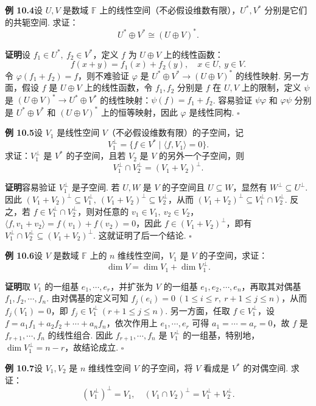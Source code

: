 \documentclass[UTF8, 12pt, fontset=fandol, oneside]{ctexart}
\begin{document}
\noindent\textbf{例 10.4}\quad 设 $U,V$ 是数域 $\mathbb{F}$ 上的线性空间（不必假设维数有限），$U^*,V^*$ 分别是它们的共轭空间. 求证：
\[
U^*\oplus V^*\cong (U\oplus V)^*.
\]

\noindent\textbf{证明}\quad 设 $f_1\in U^*,\ f_2\in V^*$，定义 $f$ 为 $U\oplus V$ 上的线性函数：
\[
f(x+y)=f_1(x)+f_2(y),\quad x\in U,\ y\in V.
\]
令 $\varphi(f_1+f_2)=f$，则不难验证 $\varphi$ 是 $U^*\oplus V^*\to (U\oplus V)^*$ 的线性映射. 另一方面，假设 $f$ 是 $U\oplus V$ 上的线性函数，令 $f_1,f_2$ 分别是 $f$ 在 $U,V$ 上的限制，定义 $\psi$ 是 $(U\oplus V)^*\to U^*\oplus V^*$ 的线性映射：$\psi(f)=f_1+f_2$. 容易验证 $\psi\varphi$ 和 $\varphi\psi$ 分别是 $U^*\oplus V^*$ 和 $(U\oplus V)^*$ 上的恒等映射，因此 $\varphi$ 是线性同构. $\square$

\noindent\textbf{例 10.5}\quad 设 $V_1$ 是线性空间 $V$（不必假设维数有限）的子空间，记
\[
V_1^\perp=\{f\in V^*\mid \langle f,V_1\rangle=0\}.
\]
求证：$V_1^\perp$ 是 $V^*$ 的子空间，且若 $V_2$ 是 $V$ 的另外一个子空间，则
\[
V_1^\perp\cap V_2^\perp=(V_1+V_2)^\perp.
\]

\noindent\textbf{证明}\quad 容易验证 $V_1^\perp$ 是子空间. 若 $U,W$ 是 $V$ 的子空间且 $U\subseteq W$，显然有 $W^\perp\subseteq U^\perp$. 因此 $(V_1+V_2)^\perp\subseteq V_1^\perp,\ (V_1+V_2)^\perp\subseteq V_2^\perp$，从而 $(V_1+V_2)^\perp\subseteq V_1^\perp\cap V_2^\perp$. 反之，若 $f\in V_1^\perp\cap V_2^\perp$，则对任意的 $v_1\in V_1,\ v_2\in V_2$，$\langle f,v_1+v_2\rangle=f(v_1)+f(v_2)=0$，因此 $f\in(V_1+V_2)^\perp$，即有 $V_1^\perp\cap V_2^\perp\subseteq (V_1+V_2)^\perp$. 这就证明了后一个结论. $\square$

\noindent\textbf{例 10.6}\quad 设 $V$ 是数域 $\mathbb{F}$ 上的 $n$ 维线性空间，$V_1$ 是 $V$ 的子空间，求证：
\[
\dim V=\dim V_1+\dim V_1^\perp.
\]

\noindent\textbf{证明}\quad 取 $V_1$ 的一组基 $e_1,\cdots,e_r$，并扩张为 $V$ 的一组基 $e_1,e_2,\cdots,e_n$，再取其对偶基 $f_1,f_2,\cdots,f_n$. 由对偶基的定义可知 $f_j(e_i)=0\ (1\le i\le r,\ r+1\le j\le n)$，从而 $f_j(V_1)=0$，即 $f_j\in V_1^\perp\ (r+1\le j\le n)$. 另一方面，任取 $f\in V_1^\perp$，设 $f=a_1f_1+a_2f_2+\cdots+a_nf_n$，依次作用上 $e_1,\cdots,e_r$ 可得 $a_1=\cdots=a_r=0$，故 $f$ 是 $f_{r+1},\cdots,f_n$ 的线性组合. 因此 $f_{r+1},\cdots,f_n$ 是 $V_1^\perp$ 的一组基，特别地，$\dim V_1^\perp=n-r$，故结论成立. $\square$

\noindent\textbf{例 10.7}\quad 设 $V_1,V_2$ 是 $n$ 维线性空间 $V$ 的子空间，将 $V$ 看成是 $V^*$ 的对偶空间. 求证：
\[
(V_1^\perp)^\perp=V_1,\quad (V_1\cap V_2)^\perp=V_1^\perp+V_2^\perp.
\]
\end{document}
